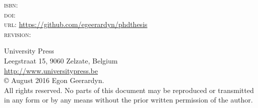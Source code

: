 \thispagestyle{empty}
\begin{bottompar}

\textsc{isbn:} \\
\textsc{doi:} \\
\textsc{url:} \url{https://github.com/egeerardyn/phdthesis}\\
\textsc{revision:} \texttt{\VCRevision}

University Press\\
Leegstraat 15, 9060 Zelzate, Belgium\\
\url{http://www.universitypress.be}\\

\copyright{} August 2016 Egon Geerardyn.\\

All rights reserved. No parts of this document may be reproduced or transmitted in any form or by any means without the prior written permission of the author.





\end{bottompar}
